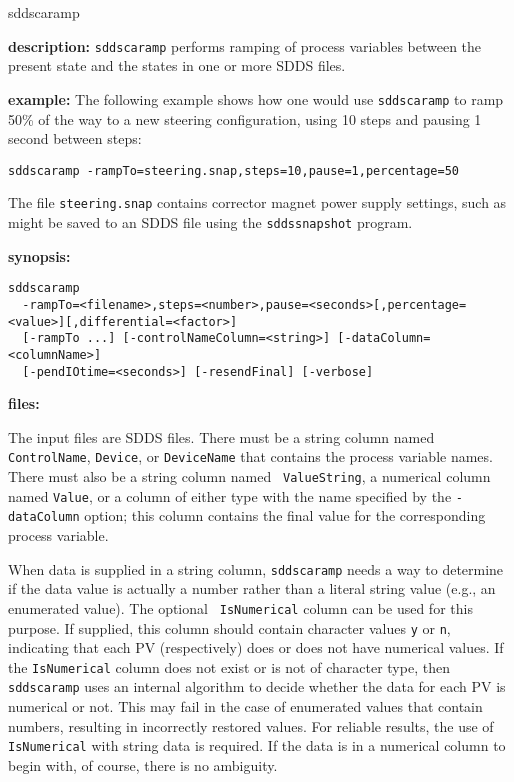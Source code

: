 \begin{sddsprog}{sddscaramp}
\item {\bf description:}
\verb+sddscaramp+ performs ramping of process variables between
the present state and the states in one or more SDDS files.

\item {\bf example:} 
% 
The following example shows how one would use \verb+sddscaramp+ to
ramp 50\% of the way to a new steering configuration, using 10
steps and pausing 1 second between steps: 
\begin{verbatim}
sddscaramp -rampTo=steering.snap,steps=10,pause=1,percentage=50
\end{verbatim}
The file \verb+steering.snap+ contains corrector magnet power supply
settings, such as might be saved to an SDDS file using the
\verb+sddssnapshot+ program.
\item {\bf synopsis:} 
\begin{verbatim}
sddscaramp
  -rampTo=<filename>,steps=<number>,pause=<seconds>[,percentage=<value>][,differential=<factor>]
  [-rampTo ...] [-controlNameColumn=<string>] [-dataColumn=<columnName>]
  [-pendIOtime=<seconds>] [-resendFinal] [-verbose]
\end{verbatim}
\item {\bf files:}

The input files are SDDS files.  There must be a string column named
{\tt ControlName}, {\tt Device}, or {\tt DeviceName} that contains the
process variable names.  There must also be a string column named {\tt
ValueString}, a numerical column named {\tt Value}, or a column of
either type with the name specified by the \verb+-dataColumn+ option;
this column contains the final value for the corresponding process
variable.  

When data is supplied in a string column, {\tt sddscaramp} needs a way
to determine if the data value is actually a number rather than a
literal string value (e.g., an enumerated value).  The optional {\tt
IsNumerical} column can be used for this purpose.  If supplied, this
column should contain character values {\tt y} or {\tt n}, indicating
that each PV (respectively) does or does not have numerical values.
If the {\tt IsNumerical} column does not exist or is not of character
type, then {\tt sddscaramp} uses an internal algorithm to decide
whether the data for each PV is numerical or not.  This may fail in
the case of enumerated values that contain numbers, resulting in
incorrectly restored values.  For reliable results, the use of {\tt
IsNumerical} with string data is required.  If the data is in a
numerical column to begin with, of course, there is no ambiguity.


\end{sddsprog}
